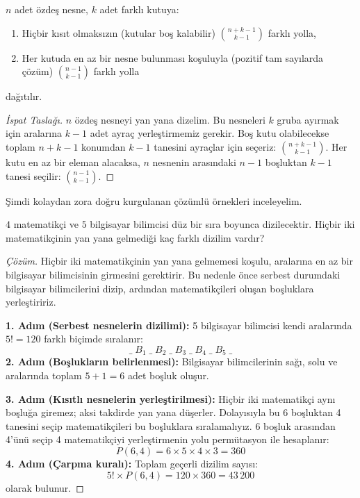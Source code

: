 \begin{theorem}
$n$ adet özdeş nesne, $k$ adet farklı kutuya:
\begin{enumerate}
    \item Hiçbir kısıt olmaksızın (kutular boş kalabilir) $\binom{n+k-1}{k-1}$ farklı yolla,
    \item Her kutuda en az bir nesne bulunması koşuluyla (pozitif tam sayılarda çözüm) $\binom{n-1}{k-1}$ farklı yolla
\end{enumerate}
dağıtılır.
\end{theorem}

\begin{proof}[İspat Taslağı]
$n$ özdeş nesneyi yan yana dizelim. Bu nesneleri $k$ gruba ayırmak için aralarına $k-1$ adet ayraç yerleştirmemiz gerekir. Boş kutu olabilecekse toplam $n+k-1$ konumdan $k-1$ tanesini ayraçlar için seçeriz: $\binom{n+k-1}{k-1}$. Her kutu en az bir eleman alacaksa, $n$ nesnenin arasındaki $n-1$ boşluktan $k-1$ tanesi seçilir: $\binom{n-1}{k-1}$.
\end{proof}

Şimdi kolaydan zora doğru kurgulanan çözümlü örnekleri inceleyelim.

\begin{example}
$4$ matematikçi ve $5$ bilgisayar bilimcisi düz bir sıra boyunca dizilecektir. Hiçbir iki matematikçinin yan yana gelmediği kaç farklı dizilim vardır?
\end{example}

\begin{proof}[Çözüm]
Hiçbir iki matematikçinin yan yana gelmemesi koşulu, aralarına en az bir bilgisayar bilimcisinin girmesini gerektirir. Bu nedenle önce serbest durumdaki bilgisayar bilimcilerini dizip, ardından matematikçileri oluşan boşluklara yerleştiririz.

\textbf{1. Adım (Serbest nesnelerin dizilimi):}
5 bilgisayar bilimcisi kendi aralarında $5! = 120$ farklı biçimde sıralanır:
\[
\_ \; B_1 \; \_ \; B_2 \; \_ \; B_3 \; \_ \; B_4 \; \_ \; B_5 \; \_
\]
\textbf{2. Adım (Boşlukların belirlenmesi):}
Bilgisayar bilimcilerinin sağı, solu ve aralarında toplam $5 + 1 = 6$ adet boşluk oluşur.

\textbf{3. Adım (Kısıtlı nesnelerin yerleştirilmesi):}
Hiçbir iki matematikçi aynı boşluğa giremez; aksi takdirde yan yana düşerler. Dolayısıyla bu 6 boşluktan 4 tanesini seçip matematikçileri bu boşluklara sıralamalıyız. 
6 boşluk arasından 4'ünü seçip 4 matematikçiyi yerleştirmenin yolu permütasyon ile hesaplanır:
\[
P(6,4) = 6 \times 5 \times 4 \times 3 = 360
\]
\textbf{4. Adım (Çarpma kuralı):}
Toplam geçerli dizilim sayısı:
\[
5! \times P(6,4) = 120 \times 360 = 43\,200
\]
olarak bulunur.
\end{proof}

